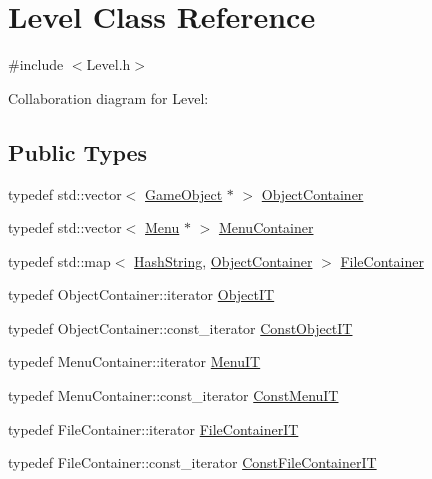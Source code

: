 \hypertarget{classLevel}{}\section{Level Class Reference}
\label{classLevel}


{\ttfamily \#include $<$Level.\+h$>$}



Collaboration diagram for Level\+:
\subsection*{Public Types}
\begin{DoxyCompactItemize}
\item 
typedef std\+::vector$<$ \hyperlink{classGameObject}{Game\+Object} $\ast$ $>$ \hyperlink{classLevel_afd39ad8a5d9272ab8e14853e0fb18a48}{Object\+Container}
\item 
typedef std\+::vector$<$ \hyperlink{classMenu}{Menu} $\ast$ $>$ \hyperlink{classLevel_a8ca95fd4c2a029af4f4df92c24556314}{Menu\+Container}
\item 
typedef std\+::map$<$ \hyperlink{classHashString}{Hash\+String}, \hyperlink{classLevel_afd39ad8a5d9272ab8e14853e0fb18a48}{Object\+Container} $>$ \hyperlink{classLevel_ace1da2e0393bc7528301ad2220c7f136}{File\+Container}
\item 
typedef Object\+Container\+::iterator \hyperlink{classLevel_a9a28b71fee93442a0a6e38075e96b0a3}{Object\+IT}
\item 
typedef Object\+Container\+::const\+\_\+iterator \hyperlink{classLevel_ae641436b16729449987f49a008240df2}{Const\+Object\+IT}
\item 
typedef Menu\+Container\+::iterator \hyperlink{classLevel_a89febf236e700e1be35f55d5d79776b0}{Menu\+IT}
\item 
typedef Menu\+Container\+::const\+\_\+iterator \hyperlink{classLevel_a9a6ea1b9ae75b0a1ccaa086d6409a68d}{Const\+Menu\+IT}
\item 
typedef File\+Container\+::iterator \hyperlink{classLevel_a224d56acc904d825c861cfad99447ff5}{File\+Container\+IT}
\item 
typedef File\+Container\+::const\+\_\+iterator \hyperlink{classLevel_a4159ff1339674f9e5b849654f0f8eff5}{Const\+File\+Container\+IT}
\end{DoxyCompactItemize}
